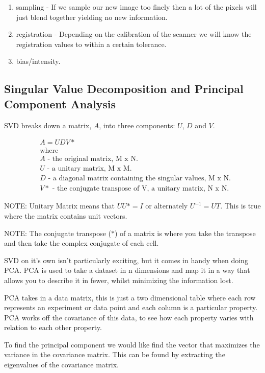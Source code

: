 \documentclass[
  oneside,
  11pt, a4paper,
  footinclude=true,
  headinclude=true,
  cleardoublepage=empty
]{scrbook}
\begin{document}
\begin{enumerate}
	\item sampling - If we sample our new image too finely then a lot of the pixels will just blend together yielding no new information.
	\item registration - Depending on the calibration of the scanner we will know the registration values to within a certain tolerance.
	\item bias/intensity.
\end{enumerate}


\newpage
\subsection{Singular Value Decomposition and Principal Component Analysis}
SVD breaks down a matrix, $A$, into three components: $U$, $D$ and $V$.

\begin{align}
& A = UDV* \nonumber \\
& \text{where} \nonumber \\
& A \text{ - the original matrix, M x N.} \nonumber \\
& U \text{ - a unitary matrix, M x M.} \nonumber \\
& D \text{ - a diagonal matrix containing the singular values, M x N.} \nonumber \\
& V* \text{ - the conjugate transpose of V, a unitary matrix, N x N.} \nonumber
\end{align}

NOTE: Unitary Matrix means that $UU* = I$ or alternately $U^{-1} = UT$. This is true where the matrix contains unit vectors.

NOTE: The conjugate transpose ($*$) of a matrix is where you take the transpose and then take the complex conjugate of each cell.

SVD on it’s own isn’t particularly exciting, but it comes in handy when doing PCA. PCA is used to take a dataset in n dimensions and map it in a way that allows you to describe it in fewer, whilst minimizing the information lost.

PCA takes in a data matrix, this is just a two dimensional table where each row represents an experiment or data point and each column is a particular property. PCA works off the covariance of this data, to see how each property varies with relation to each other property.

To find the principal component we would like find the vector that maximizes the variance in the covariance matrix. This can be found by extracting the eigenvalues of the covariance matrix.
\end{document}
